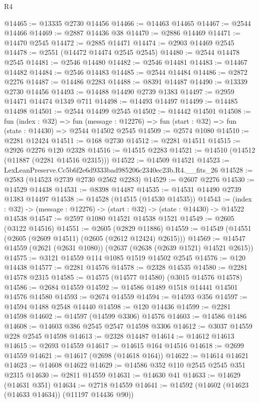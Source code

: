 \begin{lexlean}{R4}
\begin{coremodule}
@14465 := @13335 @2730 @14456
@14466 := @14463 @14465
@14467 := @2544 @14466
@14469 := @2887 @14436 @38
@14470 := @2886 @14469
@14471 := @14470 @2545
@14472 := @2885 @14471
@14474 := @2903 @14469 @2545
@14478 := @2551 (@14472 @14474 @2545 @2545)
@14480 := @2544 @14478 @2545
@14481 := @2546 @14480
@14482 := @2546 @14481
@14483 := @14467 @14482
@14484 := @2546 @14483
@14485 := @2544 @14484
@14486 := @2872 @2276
@14487 := @14486 @2283
@14488 := @8391 @14487
@14490 := @13339 @2730 @14456
@14493 := @14488 @14490 @2739 @1383
@14497 := @2959 @14471 @14474 @1349 @711
@14498 := @14493 @14497
@14499 := @14485 @14498
@14501 := @2544 @14499 @2545
@14502 := @14442 @14501
@14508 := fun (index : @32) =>
  fun (message : @12276) => fun (start : @32) => fun (state : @14430) => @2544 @14502 @2545
@14509 := @2574 @1080
@14510 := @2281 @12424
@14511 := @168 @2730
@14512 := @2281 @14511
@14515 := @2926 @2276 @120 @2328
@14516 := @14515 @2283
@14521 := @14510 (@14512 (@11887 (@2281 @14516 @2315)))
@14522 := @14509 @14521
@14523 := LexLeanPreserve.Cc5b6f2e6d9333bad985206c2340ec23b.R4.__fits_26
@14528 := @2583 (@14523 @2739 @2730 @2562 @2283)
@14529 := @2607 @2276
@14530 := @14529 @14438
@14531 := @8398 @14487
@14535 := @14531 @14490 @2739 @1383 @14497
@14538 := @14528 (@14515 (@14530 @14535))
@14543 := (index : @32) -> (message : @12276) -> (start : @32) -> (state : @14430) -> @14522 @14538
@14547 := @2597 @1080 @14521 @14538 @1521
@14549 := @2605 (@3122 @14516)
@14551 := @2605 (@2829 @11886)
@14559 := @14549 (@14551 (@2605 (@2609 @14511) (@2605 (@2612 @12424) @2615)))
@14569 := @14547 @14559 (@2621 (@2631 @1080)) (@2637 (@2638 (@2639 @1521) @14521 @2615))
@14575 := @3121 @14559 @114 @1085 @1519 @14502 @2545
@14576 := @120 @14438
@14577 := @2281 @14576
@14578 := @2328 @14535
@14580 := @2281 @14578 @2315
@14585 := @14575 (@14577 @14580) (@3015 @14576 @14578)
@14586 := @2684 @14559
@14592 := @14586 @1489 @1518 @14441 @14501 @14576 @14580
@14593 := @2674 @14559
@14594 := @14593 @356
@14597 := @14594 @1488 @2548 @14440
@14598 := @120 @14436
@14599 := @2281 @14598
@14602 := @14597 (@14599 @3306) @14576
@14603 := @14586 @1486
@14608 := @14603 @386 @2545 @2547 @14598 @3306
@14612 := @3037 @14559 @228 @2545 @14598
@14613 := @2328 @14487
@14614 := @14612 @14613
@14615 := @2693 @14559
@14617 := @14615 @164 @14516
@14618 := @2699 @14559
@14621 := @14617 (@2698 (@14618 @164))
@14622 := @14614 @14621
@14623 := @14608 @14622
@14629 := @14586 @352 @110 @2545 @2545 @351 @2315
@14630 := @2811 @14559
@14631 := @14630 @41
@14633 := @14629 (@14631 @351)
@14634 := @2718 @14559
@14641 := @14592 (@14602 (@14623 (@14633 @14634)) (@11197 @14436 @90))

\end{coremodule}
\end{lexlean}
